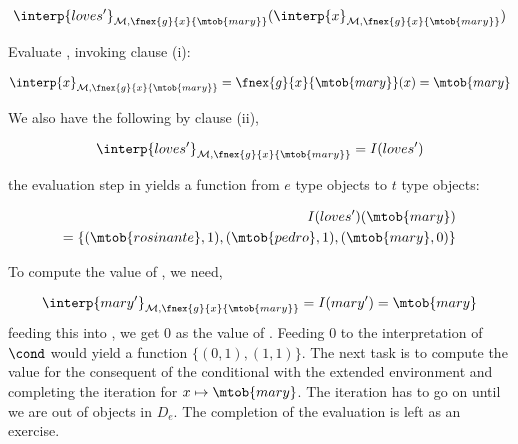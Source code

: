 \documentclass[11pt,a4paper]{article}
\begin{document}
\begin{align}\label{lovesx}
\interp{loves'}_{\mathcal{M},\fnex{g}{x}{\mtob{mary}}} (\interp{x}_{\mathcal{M},\fnex{g}{x}{\mtob{mary}}})
\end{align}

Evaluate , invoking clause (i):

\begin{align}
\interp{x}_{\mathcal{M},\fnex{g}{x}{\mtob{mary}}} = \fnex{g}{x}{\mtob{mary}}(x) = \mtob{mary}
\end{align}

We also have the following by clause (ii),

\begin{align}
\interp{loves'}_{\mathcal{M},\fnex{g}{x}{\mtob{mary}}} = I(loves')
\end{align}

the evaluation step in  yields a function from $e$ type objects to $t$ type objects:

\begin{align}\label{lovesxval}
I(loves') (\mtob{mary}) \\
= \{(\mtob{rosinante}, 1), (\mtob{pedro}, 1), (\mtob{mary}, 0)\} 
\end{align}

To compute the value of , we need,

\begin{align}
\interp{mary'}_{\mathcal{M},\fnex{g}{x}{\mtob{mary}}} = I(mary') = \mtob{mary}
\end{align}
feeding this into , we get 0 as the value of . Feeding 0 to the interpretation of $\cond$ would yield a function $\{(0,1), (1,1)\}$. The next task is to compute the value for the consequent of the conditional with the extended environment and completing the iteration for $x\mapsto \mtob{mary}$. The iteration has to go on until we are out of objects in $D_e$. The completion of the evaluation is left as an exercise.




%
\end{document}
